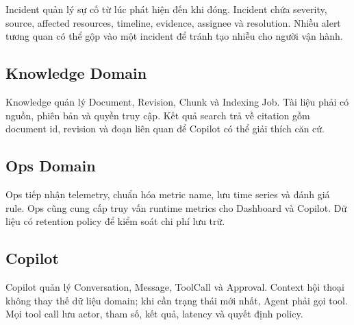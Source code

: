 Incident quản lý sự cố từ lúc phát hiện đến khi đóng. Incident chứa severity,
source, affected resources, timeline, evidence, assignee và resolution. Nhiều
alert tương quan có thể gộp vào một incident để tránh tạo nhiễu cho người vận hành.

\subsection{Knowledge Domain}

Knowledge quản lý Document, Revision, Chunk và Indexing Job. Tài liệu phải có
nguồn, phiên bản và quyền truy cập. Kết quả search trả về citation gồm document
id, revision và đoạn liên quan để Copilot có thể giải thích căn cứ.

\subsection{Ops Domain}

Ops tiếp nhận telemetry, chuẩn hóa metric name, lưu time series và đánh giá rule.
Ops cũng cung cấp truy vấn runtime metrics cho Dashboard và Copilot. Dữ liệu có
retention policy để kiểm soát chi phí lưu trữ.

\subsection{Copilot}

Copilot quản lý Conversation, Message, ToolCall và Approval. Context hội thoại
không thay thế dữ liệu domain; khi cần trạng thái mới nhất, Agent phải gọi tool.
Mọi tool call lưu actor, tham số, kết quả, latency và quyết định policy.